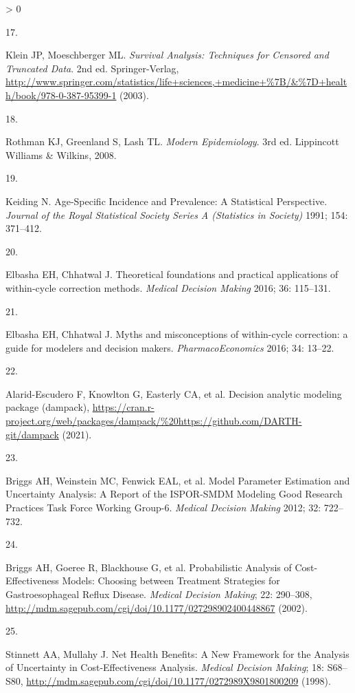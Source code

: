 \documentclass[
]{article}
\newlength{\cslhangindent}
\newlength{\csllabelwidth}
\newenvironment{CSLReferences}[2] %
 {%
  \setlength{\parindent}{0pt}
  \ifodd #1 \everypar{\setlength{\hangindent}{\cslhangindent}}\ignorespaces\fi
  \ifnum #2 > 0
  \setlength{\parskip}{#2\baselineskip}
  \fi
 }%
 {}
\newcommand{\CSLLeftMargin}[1]{\parbox[t]{\csllabelwidth}{#1}}
\newcommand{\CSLRightInline}[1]{\parbox[t]{\linewidth - \csllabelwidth}{#1}\break}
\begin{document}
\begin{CSLReferences}{0}{0}
\leavevmode\hypertarget{ref-Klein2003}{}%
\CSLLeftMargin{17. }
\CSLRightInline{Klein JP, Moeschberger ML. \emph{{Survival Analysis: Techniques for Censored and Truncated Data}}. 2nd ed. Springer-Verlag, \url{http://www.springer.com/statistics/life+sciences,+medicine+\%7B/\&\%7D+health/book/978-0-387-95399-1} (2003).}

\leavevmode\hypertarget{ref-Rothman2008h}{}%
\CSLLeftMargin{18. }
\CSLRightInline{Rothman KJ, Greenland S, Lash TL. \emph{{Modern Epidemiology}}. 3rd ed. Lippincott Williams {\&} Wilkins, 2008.}

\leavevmode\hypertarget{ref-Keiding1991}{}%
\CSLLeftMargin{19. }
\CSLRightInline{Keiding N. {Age-Specific Incidence and Prevalence: A Statistical Perspective}. \emph{Journal of the Royal Statistical Society Series A (Statistics in Society)} 1991; 154: 371--412.}

\leavevmode\hypertarget{ref-Elbasha2016}{}%
\CSLLeftMargin{20. }
\CSLRightInline{Elbasha EH, Chhatwal J. {Theoretical foundations and practical applications of within-cycle correction methods}. \emph{Medical Decision Making} 2016; 36: 115--131.}

\leavevmode\hypertarget{ref-Elbasha2016a}{}%
\CSLLeftMargin{21. }
\CSLRightInline{Elbasha EH, Chhatwal J. {Myths and misconceptions of within-cycle correction: a guide for modelers and decision makers}. \emph{PharmacoEconomics} 2016; 34: 13--22.}

\leavevmode\hypertarget{ref-Alarid-Escudero2021}{}%
\CSLLeftMargin{22. }
\CSLRightInline{Alarid-Escudero F, Knowlton G, Easterly CA, et al. Decision analytic modeling package (dampack), \url{https://cran.r-project.org/web/packages/dampack/\%20https://github.com/DARTH-git/dampack} (2021).}

\leavevmode\hypertarget{ref-Briggs2012}{}%
\CSLLeftMargin{23. }
\CSLRightInline{Briggs AH, Weinstein MC, Fenwick EAL, et al. {Model Parameter Estimation and Uncertainty Analysis: A Report of the ISPOR-SMDM Modeling Good Research Practices Task Force Working Group-6.} \emph{Medical Decision Making} 2012; 32: 722--732.}

\leavevmode\hypertarget{ref-Briggs2002}{}%
\CSLLeftMargin{24. }
\CSLRightInline{Briggs AH, Goeree R, Blackhouse G, et al. {Probabilistic Analysis of Cost-Effectiveness Models: Choosing between Treatment Strategies for Gastroesophageal Reflux Disease}. \emph{Medical Decision Making}; 22: 290--308, \url{http://mdm.sagepub.com/cgi/doi/10.1177/027298902400448867} (2002).}

\leavevmode\hypertarget{ref-Stinnett1998b}{}%
\CSLLeftMargin{25. }
\CSLRightInline{Stinnett AA, Mullahy J. {Net Health Benefits: A New Framework for the Analysis of Uncertainty in Cost-Effectiveness Analysis}. \emph{Medical Decision Making}; 18: S68--S80, \url{http://mdm.sagepub.com/cgi/doi/10.1177/0272989X9801800209} (1998).}


\end{CSLReferences}
\end{document}
